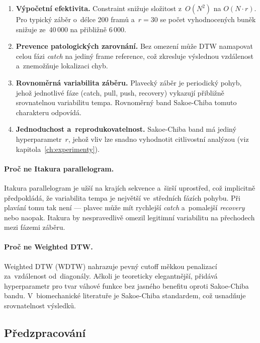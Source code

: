 \begin{enumerate}
    \item \textbf{Výpočetní efektivita.} Constraint snižuje složitost z~$O(N^2)$ na $O(N \cdot r)$. Pro typický záběr o~délce 200 framů a~$r = 30$ se počet vyhodnocených buněk snižuje ze~40\,000 na přibližně 6\,000.

    \item \textbf{Prevence patologických zarovnání.} Bez omezení může DTW namapovat celou fázi \textit{catch} na jediný frame reference, což zkresluje výslednou vzdálenost a~znemožňuje lokalizaci chyb.

    \item \textbf{Rovnoměrná variabilita záběru.} Plavecký záběr je periodický pohyb, jehož jednotlivé fáze (catch, pull, push, recovery) vykazují přibližně srovnatelnou variabilitu tempa. Rovnoměrný band Sakoe-Chiba tomuto charakteru odpovídá.

    \item \textbf{Jednoduchost a~reprodukovatelnost.} Sakoe-Chiba band má jediný hyperparametr~$r$, jehož vliv lze snadno vyhodnotit citlivostní analýzou (viz kapitola~\ref{ch:experimenty}).
\end{enumerate}

\paragraph{Proč ne Itakura parallelogram.}
Itakura parallelogram je užší na krajích sekvence a~širší uprostřed, což implicitně předpokládá, že variabilita tempa je největší ve~středních fázích pohybu. Při plavání tomu tak není --- plavec může mít rychlejší \textit{catch} a~pomalejší \textit{recovery} nebo naopak. Itakura by nespravedlivě omezil legitimní variabilitu na přechodech mezi fázemi záběru.

\paragraph{Proč ne Weighted DTW.}
Weighted DTW (WDTW) nahrazuje pevný cutoff měkkou penalizací za~vzdálenost od~diagonály. Ačkoli je teoreticky elegantnější, přidává hyperparametr pro tvar váhové funkce bez jasného benefitu oproti Sakoe-Chiba bandu. V~biomechanické literatuře je Sakoe-Chiba standardem, což usnadňuje srovnatelnost výsledků.

\subsection{Předzpracování}

